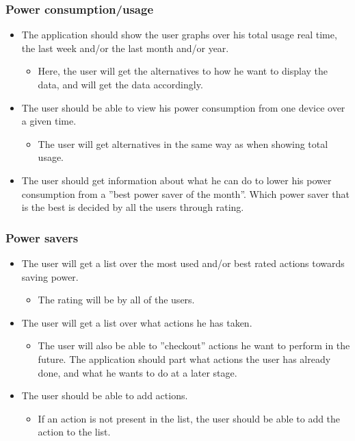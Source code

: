 \subsubsection{Power consumption/usage}
\begin{itemize}
\item The application should show the user graphs over his total usage real time, the last week and/or the last month and/or year.
\begin{itemize}
\item Here, the user will get the alternatives to how he want to display the data, and will get the data accordingly.
\end{itemize}
\item The user should be able to view his power consumption from one device over a given time.
\begin{itemize}
\item The user will get alternatives in the same way as when showing total usage.
\end{itemize}
\item The user should get information about what he can do to lower his power consumption from a ''best power saver of the month''. Which power saver that is the best is decided by all the users through rating.
\end{itemize}

\subsubsection{Power savers}

\begin{itemize}
\item The user will get a list over the most used and/or best rated actions towards saving power.
\begin{itemize}
\item The rating will be by all of the users.
\end{itemize}
\item The user will get a list over what actions he has taken.
\begin{itemize}
\item The user will also be able to ''checkout'' actions he want to perform in the future. The application should part what actions the user has already done, and what he wants to do at a later stage.
\end{itemize}
\item The user should be able to add actions.
\begin{itemize}
\item If an action is not present in the list, the user should be able to add the action to the list.
\end{itemize}
\end{itemize}


